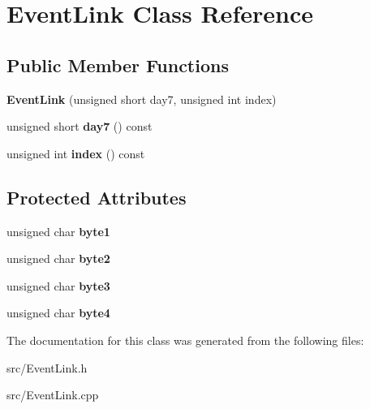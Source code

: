 \hypertarget{class_event_link}{}\section{Event\+Link Class Reference}
\label{class_event_link}
\subsection*{Public Member Functions}
\begin{DoxyCompactItemize}
\item 
\hypertarget{class_event_link_a873eabea6a8584e35b8305cc8238d3df}{}{\bfseries Event\+Link} (unsigned short day7, unsigned int index)\label{class_event_link_a873eabea6a8584e35b8305cc8238d3df}

\item 
\hypertarget{class_event_link_ae3ae448d4dc315fc32872910f122b50d}{}unsigned short {\bfseries day7} () const \label{class_event_link_ae3ae448d4dc315fc32872910f122b50d}

\item 
\hypertarget{class_event_link_a57e967cd92edf923f846beb4b8a59f3d}{}unsigned int {\bfseries index} () const \label{class_event_link_a57e967cd92edf923f846beb4b8a59f3d}

\end{DoxyCompactItemize}
\subsection*{Protected Attributes}
\begin{DoxyCompactItemize}
\item 
\hypertarget{class_event_link_acb420b117d99f48b7394dd98ac6c4914}{}unsigned char {\bfseries byte1}\label{class_event_link_acb420b117d99f48b7394dd98ac6c4914}

\item 
\hypertarget{class_event_link_a9ca91cb35cdc9078f1d501fd204879d7}{}unsigned char {\bfseries byte2}\label{class_event_link_a9ca91cb35cdc9078f1d501fd204879d7}

\item 
\hypertarget{class_event_link_ad8dd2d7a5e1202bdfe726be5263d6900}{}unsigned char {\bfseries byte3}\label{class_event_link_ad8dd2d7a5e1202bdfe726be5263d6900}

\item 
\hypertarget{class_event_link_a3854d0a6149d5b005ab39b75cb9fda09}{}unsigned char {\bfseries byte4}\label{class_event_link_a3854d0a6149d5b005ab39b75cb9fda09}

\end{DoxyCompactItemize}


The documentation for this class was generated from the following files\+:\begin{DoxyCompactItemize}
\item 
src/Event\+Link.\+h\item 
src/Event\+Link.\+cpp\end{DoxyCompactItemize}
